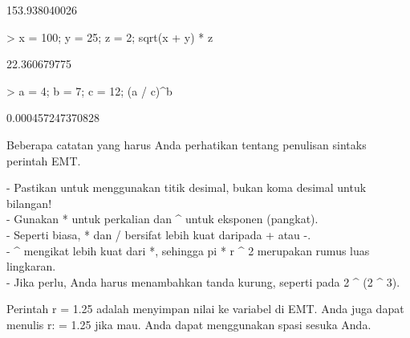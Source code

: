 \documentclass{report}
\begin{document}
\begin{eulernotebook}
\begin{eulercomment}
\begin{eulercomment}
\begin{euleroutput}
  153.938040026
\end{euleroutput}
\begin{eulerprompt}
> x = 100; y = 25; z = 2; sqrt(x + y) * z
\end{eulerprompt}
\begin{euleroutput}
  22.360679775
\end{euleroutput}
\begin{eulerprompt}
> a = 4; b = 7; c = 12; (a / c)^b
\end{eulerprompt}
\begin{euleroutput}
  0.000457247370828
\end{euleroutput}
\eulersubheading{}
\begin{eulercomment}
Beberapa catatan yang harus Anda perhatikan tentang penulisan sintaks
perintah EMT.

- Pastikan untuk menggunakan titik desimal, bukan koma desimal untuk
bilangan!\\
- Gunakan * untuk perkalian dan \textasciicircum{} untuk eksponen (pangkat).\\
- Seperti biasa, * dan / bersifat lebih kuat daripada + atau -.\\
- \textasciicircum{} mengikat lebih kuat dari *, sehingga pi * r \textasciicircum{} 2 merupakan rumus
luas lingkaran.\\
- Jika perlu, Anda harus menambahkan tanda kurung, seperti pada 2 \textasciicircum{} (2
\textasciicircum{} 3).

Perintah r = 1.25 adalah menyimpan nilai ke variabel di EMT. Anda juga
dapat menulis r: = 1.25 jika mau. Anda dapat menggunakan spasi sesuka
Anda.


\end{eulercomment}
\end{eulercomment}
\end{eulercomment}
\end{eulernotebook}
\end{document}
